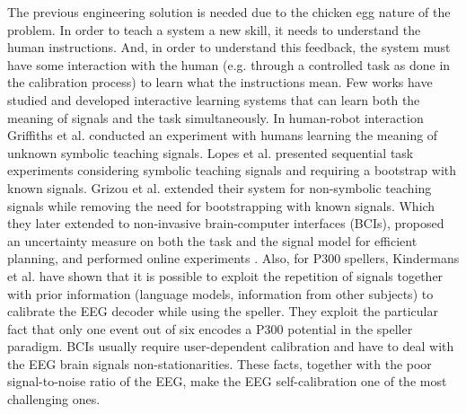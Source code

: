 The previous engineering solution is needed due to the chicken egg nature of the problem. In order to teach a system a new skill, it needs to understand the human instructions. And, in order to understand this feedback, the system must have some interaction with the human (e.g. through a controlled task as done in the calibration process) to learn what the instructions mean. 
Few works have studied and developed interactive learning systems that can learn both the meaning of signals and the task simultaneously. In human-robot interaction Griffiths et al. \cite{griffiths2012bottom} conducted an experiment with humans learning the meaning of unknown symbolic teaching signals. Lopes et al. \cite{macl11simul} presented sequential task experiments considering symbolic teaching signals and requiring a bootstrap with known signals. Grizou et al. \cite{grizou2013robot} extended their system for non-symbolic teaching signals while removing the need for bootstrapping with known signals. Which they later extended to non-invasive brain-computer interfaces (BCIs), proposed an uncertainty measure on both the task and the signal model for efficient planning, and performed online experiments \cite{grizou2014calibration}. Also, for P300 spellers, Kindermans et al. have shown that it is possible to exploit the repetition of signals \cite{Kindermans2012a} together with prior information (language models, information from other subjects) \cite{kindermans2014integrating} to calibrate the EEG decoder while using the speller. They exploit the particular fact that only one event out of six encodes a P300 potential in the speller paradigm. BCIs usually require user-dependent calibration and have to deal with the EEG brain signals non-stationarities. These facts, together with the poor signal-to-noise ratio of the EEG, make the EEG self-calibration one of the most challenging ones. 


